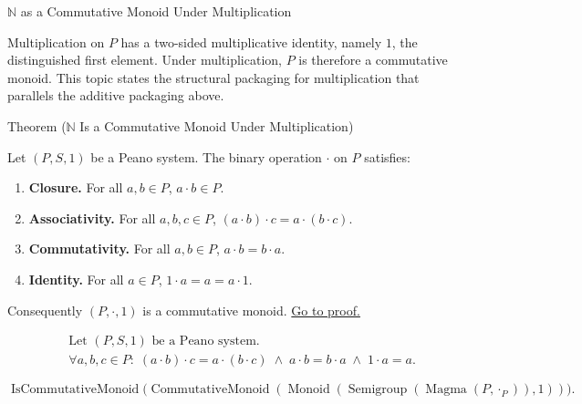\begin{topicbox}{$\mathbb{N}$ as a Commutative Monoid Under Multiplication}
\begin{exposition}
Multiplication on $P$ has a two-sided multiplicative identity, namely $1$,
the distinguished first element. Under multiplication, $P$ is therefore a
commutative monoid. This topic states the structural packaging for multiplication
that parallels the additive packaging above.
\end{exposition}

\begin{theorembox}{Theorem ($\mathbb{N}$ Is a Commutative Monoid Under Multiplication)}
\begin{theorem}
\label{thm:n-multiplicative-monoid}
Let $(P,S,1)$ be a Peano system. The binary operation $\cdot$ on $P$ satisfies:
\begin{enumerate}
  \item \textbf{Closure.} For all $a,b \in P$, $a \cdot b \in P$.
  \item \textbf{Associativity.} For all $a,b,c \in P$,
  $(a \cdot b) \cdot c = a \cdot (b \cdot c)$.
  \item \textbf{Commutativity.} For all $a,b \in P$,
  $a \cdot b = b \cdot a$.
  \item \textbf{Identity.} For all $a \in P$,
  $1 \cdot a = a = a \cdot 1$.
\end{enumerate}
Consequently $(P, \cdot, 1)$ is a commutative monoid.
\hyperref[prf:n-multiplicative-monoid]{Go to proof.}
\end{theorem}
\end{theorembox}

\begin{remark*}
\[
\begin{aligned}
&\text{Let } (P,S,1) \text{ be a Peano system.}\\
&\forall a,b,c \in P:\;
(a \cdot b) \cdot c = a \cdot (b \cdot c)
\;\land\;
a \cdot b = b \cdot a
\;\land\;
1 \cdot a = a.
\end{aligned}
\]
\end{remark*}

\begin{remark*}
\[
\operatorname{IsCommutativeMonoid}
\bigl(\operatorname{CommutativeMonoid}
(\operatorname{Monoid}(\operatorname{Semigroup}(\operatorname{Magma}(P,\cdot_P)),1))\bigr).
\]
\end{remark*}


\end{topicbox}
